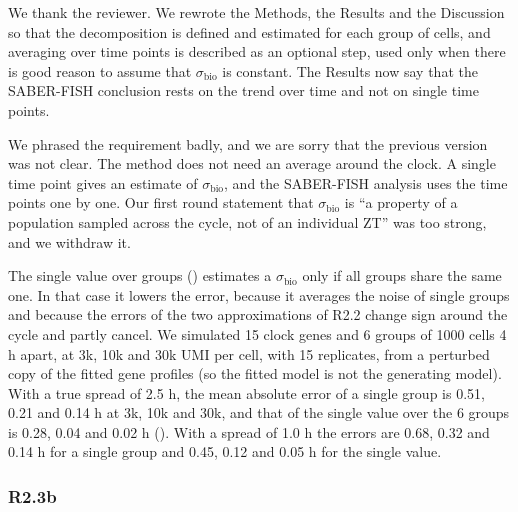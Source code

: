 
\response
We thank the reviewer. We rewrote the Methods, the Results and the Discussion so that the decomposition is defined and estimated for each group of cells, and averaging over time points is described as an optional step, used only when there is good reason to assume that $\sigma_{\text{bio}}$ is constant. The Results now say that the SABER-FISH conclusion rests on the trend over time and not on single time points.

We phrased the requirement badly, and we are sorry that the previous version was not clear. The method does not need an average around the clock. A single time point gives an estimate of $\sigma_{\text{bio}}$, and the SABER-FISH analysis uses the time points one by one. Our first round statement that $\sigma_{\text{bio}}$ is ``a property of a population sampled across the cycle, not of an individual ZT'' was too strong, and we withdraw it.

The single value over groups () estimates a $\sigma_{\text{bio}}$ only if all groups share the same one. In that case it lowers the error, because it averages the noise of single groups and because the errors of the two approximations of R2.2 change sign around the cycle and partly cancel. We simulated 15 clock genes and 6 groups of 1000 cells 4 h apart, at 3k, 10k and 30k UMI per cell, with 15 replicates, from a perturbed copy of the fitted gene profiles (so the fitted model is not the generating model). With a true spread of 2.5 h, the mean absolute error of a single group is 0.51, 0.21 and 0.14 h at 3k, 10k and 30k, and that of the single value over the 6 groups is 0.28, 0.04 and 0.02 h (). With a spread of 1.0 h the errors are 0.68, 0.32 and 0.14 h for a single group and 0.45, 0.12 and 0.05 h for the single value.

\figEstimatorAbsError

\subsubsection*{R2.3b}

